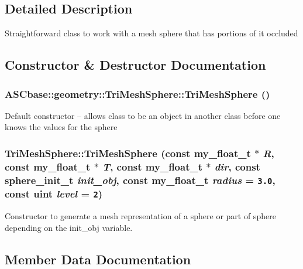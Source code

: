 \subsection{Detailed Description}
Straightforward class to work with a mesh sphere that has portions of it occluded 



\subsection{Constructor \& Destructor Documentation}
\subsubsection{\setlength{\rightskip}{0pt plus 5cm}ASCbase::geometry::Tri\-Mesh\-Sphere::Tri\-Mesh\-Sphere ()\hspace{0.3cm}{\tt  [inline]}}\label{classASCbase_1_1geometry_1_1TriMeshSphere_1e6bc0c8cf5b808ab92acbbf0648ac4c}


Default constructor -- allows class to be an object in another class before one knows the values for the sphere 
\subsubsection{\setlength{\rightskip}{0pt plus 5cm}Tri\-Mesh\-Sphere::Tri\-Mesh\-Sphere (const my\_\-float\_\-t $\ast$ {\em R}, const my\_\-float\_\-t $\ast$ {\em T}, const my\_\-float\_\-t $\ast$ {\em dir}, const \bf{sphere\_\-init\_\-t} {\em init\_\-obj}, const my\_\-float\_\-t {\em radius} = {\tt 3.0}, const uint {\em level} = {\tt 2})}\label{classASCbase_1_1geometry_1_1TriMeshSphere_e64b7ebd41fc3709a78a96c0ef36df88}


Constructor to generate a mesh representation of a sphere or part of sphere depending on the init\_\-obj variable. 

\subsection{Member Data Documentation}
